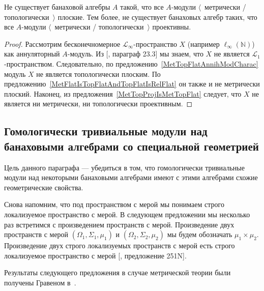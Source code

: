 \begin{proposition} Не существует банаховой алгебры $A$ такой, что все
$A$-модули $\langle$~метрически / топологически~$\rangle$ плоские. Тем более, не
существует банаховых алгебр таких, что все $A$-модули $\langle$~метрически /
топологически~$\rangle$ проективны.
\end{proposition}
\begin{proof} Рассмотрим бесконечномерное $\mathscr{L}_\infty$-пространство $X$
(например $\ell_\infty(\mathbb{N})$) как аннуляторный $A$-модуль. Из
[\cite{DefFloTensNorOpId}, параграф 23.3] мы знаем, что $X$ не является
$\mathscr{L}_1$-пространством. Следовательно, по
предложению~\ref{MetTopFlatAnnihModCharac} модуль $X$ не является топологически
плоским. По предложению~\ref{MetFlatIsTopFlatAndTopFlatIsRelFlat} он также и не
метрически плоский. Наконец, из предложения~\ref{MetTopProjIsMetTopFlat}
следует, что $X$ не является ни метрически, ни топологически проективным.
\end{proof}


\subsection{
    Гомологически тривиальные модули над банаховыми 
    алгебрами со специальной геометрией
}\label{
    SubSectionHomologicallyTrivialModulesOverBanachAlgebrasWithSpecificGeometry
}

Цель данного параграфа --- убедиться в том, что гомологически тривиальные модули
над некоторыми банаховыми алгебрами имеют с этими алгебрами схожие
геометрические свойства.

Снова напомним, что под пространством с мерой мы понимаем строго локализуемое
пространство с мерой. В следующем предложении мы несколько раз встретимся с
произведением пространств с мерой. Произведение двух пространств с мерой
$(\Omega_1,\Sigma_1,\mu_1)$ и $(\Omega_2,\Sigma_2,\mu_2)$ мы будем обозначать
$\mu_1\times \mu_2$. Произведение двух строго локализуемых пространств с мерой
есть  строго локализуемое пространство с мерой [\cite{FremMeasTh}, предложение
251N]. 

Результаты следующего предложения в случае метрической теории были получены
Гравеном в~\cite{GravInjProjBanMod}.


